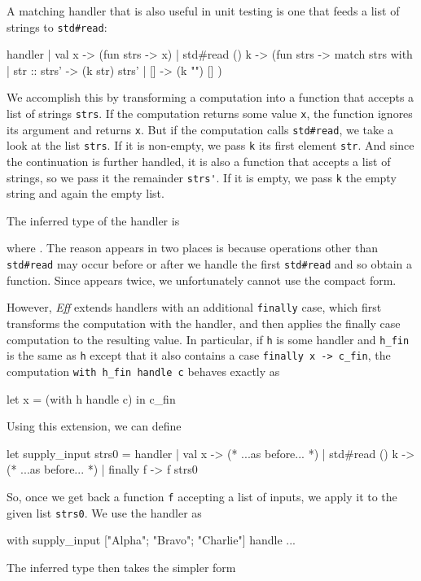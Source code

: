 \documentclass{LMCS}
\newcommand{\Eff}{\emph{Eff}\xspace}
\let\inline\lstinline
\begin{document}
A matching handler that is also useful in unit testing is one that feeds a list of strings to \inline{std#read}:
\begin{source}
  handler
  | val x -> (fun strs -> x)
  | std#read () k -> (fun strs ->
      match strs with
      | str :: strs' -> (k str) strs'
      | [] -> (k "") []
    )
\end{source}
We accomplish this by transforming a computation into a function that accepts a list of strings \inline{strs}.
If the computation returns some value \inline{x},
the function ignores its argument and returns \inline{x}.
But if the computation calls \inline{std#read}, we take a look at the list \inline{strs}.
If it is non-empty, we pass \inline{k} its first element \inline{str}.
And since the continuation is further handled,
it is also a function that accepts a list of strings,
so we pass it the remainder \inline{strs'}.
If it is empty, we pass \inline{k} the empty string and again the empty list.

The inferred type of the handler is

where .
The reason  appears in two places is
because operations other than \inline{std#read} may occur before or after we handle the first \inline{std#read} and so obtain a function.
Since  appears twice, we unfortunately cannot use the compact form.

\label{page:finally}
However, \Eff extends handlers with an additional \inline{finally} case,
which first transforms the computation with the handler,
and then applies the finally case computation to the resulting value.
In particular, if \inline{h} is some handler and \inline{h_fin} is the same as \inline{h}
except that it also contains a case \inline{finally x -> c_fin},
the computation \inline{with h_fin handle c} behaves exactly as
\begin{source}
  let x = (with h handle c) in c_fin
\end{source}
Using this extension, we can define
\begin{source}
  let supply_input strs0 =
    handler
    | val x -> (* ...as before... *)
    | std#read () k -> (* ...as before... *)
    | finally f -> f strs0
\end{source}
So, once we get back a function \inline{f} accepting a list of inputs, we apply it to the given list \inline{strs0}.
We use the handler as
\begin{source}
  with
    supply_input ["Alpha"; "Bravo"; "Charlie"]
  handle
    ...
\end{source}
The inferred type then takes the simpler form
\end{document}
